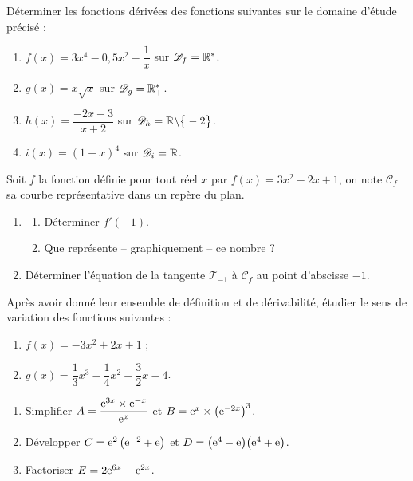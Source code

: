 \documentclass[a4paper,11pt]{article}
\begin{document}
\begin{cexercice}
Déterminer les fonctions dérivées des fonctions suivantes sur le domaine d’étude précisé :
%
\begin{enumerate}
	\item $f(x)=3x^4-0,5x^2-\dfrac1x$ sur $\mathscr{D}_f = \R^*$.
	\item $g(x)=x\sqrt{x}$ sur $\mathscr{D}_g = \R_{+}^{*}$.
	\item $h(x)=\dfrac{-2x-3}{x+2}$ sur $\mathscr{D}_h = \R \backslash \bigr\{ -2 \bigr\}$.
	\item $i(x)=(1-x)^4$ sur $\mathscr{D}_i = \R$.
\end{enumerate}
\end{cexercice}

\begin{cexercice}
Soit $f$ la fonction définie pour tout réel $x$ par $f(x)=3x^2-2x+1$, on note $\mathscr{C}_f$ sa courbe représentative dans un repère du plan.
%
\begin{enumerate}
	\item 
	\begin{enumerate}
		\item Déterminer $f'(-1)$.
		\item Que représente -- graphiquement -- ce nombre ?
	\end{enumerate}
	\item Déterminer l’équation de la tangente $\mathscr{T}_{-1}$ à $\mathscr{C}_f$ au point d’abscisse $-1$.
\end{enumerate}
\end{cexercice}

\begin{cexercice}
Après avoir donné leur ensemble de définition et de dérivabilité, étudier le sens de variation des fonctions suivantes :
%
\begin{enumerate}
	\item $f(x)=-3x^2+2x+1$ ;
	\item $g(x)=\dfrac{1}{3}x^3 - \dfrac14 x^2 - \dfrac{3}{2}x-4$.
\end{enumerate}
\end{cexercice}

\begin{cexercice}
\vspace{-0.8\baselineskip}
\begin{enumerate}[leftmargin=*]
	\item Simplifier $A=\dfrac{{\rm e}^{3x} \times {\rm e}^{-x}}{{\rm e}^x}$ et $B={\rm e}^x \times \big({\rm e}^{-2x}\big)^3$.
	\item Développer $C={\rm e}^2\left({\rm e}^{-2}+{\rm e}\right)$ et $D=\big({\rm e}^4-{\rm e}\big)\big({\rm e}^4+{\rm e}\big)$.
	\item Factoriser $E=2{\rm e}^{6x}-{\rm e}^{2x}\vphantom{1_1}$.
\end{enumerate}
\end{cexercice}
\end{document}
